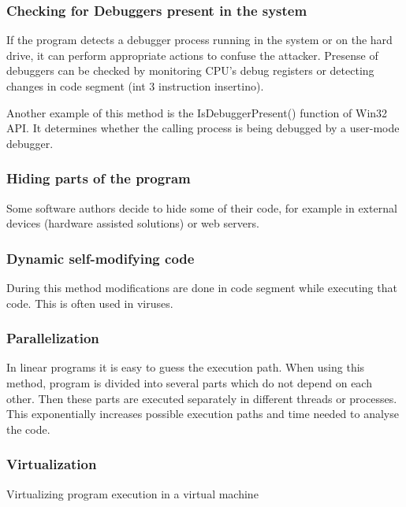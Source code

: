 \documentclass[a4paper,12pt]{article}
\begin{document}
\subsubsection{Checking for Debuggers present in the system}
If the program detects a debugger process running in the system or on the
hard drive, it can perform appropriate actions to confuse the attacker.
Presense of debuggers can be checked by monitoring CPU's debug registers
or detecting changes in code segment (int 3 instruction insertino).

Another example of this method is the IsDebuggerPresent() function of Win32
API. It determines whether the calling process is being debugged by a
user-mode debugger.

\subsubsection{Hiding parts of the program}
Some software authors decide to hide some of their code, for example in
external devices (hardware assisted solutions) or web servers.

\subsubsection{Dynamic self-modifying code}
During this method modifications are done in code segment while executing
that code. This is often used in viruses.

\subsubsection{Parallelization}
In linear programs it is easy to guess the execution path. When using this
method, program is divided into several parts which do not depend on each
other. Then these parts are executed separately in different threads or
processes. This exponentially increases possible execution paths and time
needed to analyse the code.

\subsubsection{Virtualization}
Virtualizing program execution in a virtual machine
\end{document}

